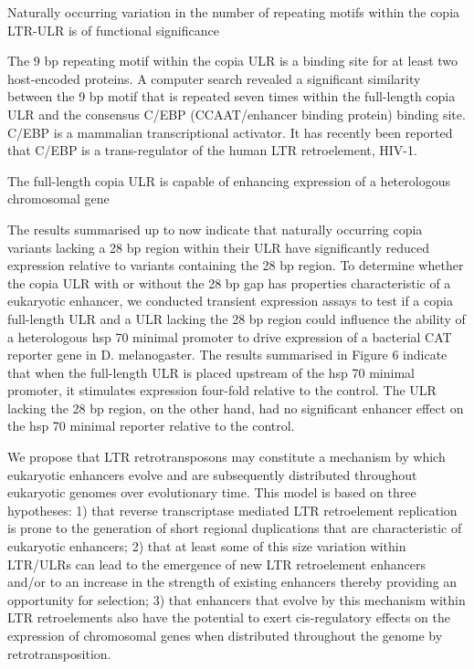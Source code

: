 Naturally occurring variation in the number of repeating motifs within the copia LTR-ULR is of functional significance

The 9 bp repeating motif within the copia ULR is a binding site for at least two host-encoded proteins. A computer search revealed a significant similarity between the 9 bp motif that is repeated seven times within the full-length copia ULR and the consensus C/EBP (CCAAT/enhancer binding protein) binding site. C/EBP is a mammalian transcriptional activator. It has recently been reported that C/EBP is a trans-regulator of the human LTR retroelement, HIV-1.

The full-length copia ULR is capable of enhancing expression of a heterologous chromosomal gene

The results summarised up to now indicate that naturally occurring copia variants lacking a 28 bp region within their ULR have significantly reduced expression relative to variants containing the 28 bp region. To determine whether the copia ULR with or without the 28 bp gap has properties characteristic of a eukaryotic enhancer, we conducted transient expression assays to test if a copia full-length ULR and a ULR lacking the 28 bp region could influence the ability of a heterologous hsp 70 minimal promoter to drive expression of a bacterial CAT reporter gene in D. melanogaster. The results summarised in Figure 6 indicate that when the full-length ULR is placed upstream of the hsp 70 minimal promoter, it stimulates expression four-fold relative to the control. The ULR lacking the 28 bp region, on the other hand, had no significant enhancer effect on the hsp 70 minimal reporter relative to the control.

We propose that LTR retrotransposons may constitute a mechanism by which eukaryotic enhancers evolve and are subsequently distributed throughout eukaryotic genomes over evolutionary time. This model is based on three hypotheses: 1) that reverse transcriptase mediated LTR retroelement replication is prone to the generation of short regional duplications that are characteristic of eukaryotic enhancers; 2) that at least some of this size variation within LTR/ULRs can lead to the emergence of new LTR retroelement enhancers and/or to an increase in the strength of existing enhancers thereby providing an opportunity for selection; 3) that enhancers that evolve by this mechanism within LTR retroelements also have the potential to exert cis-regulatory effects on the expression of chromosomal genes when distributed throughout the genome by retrotransposition.

